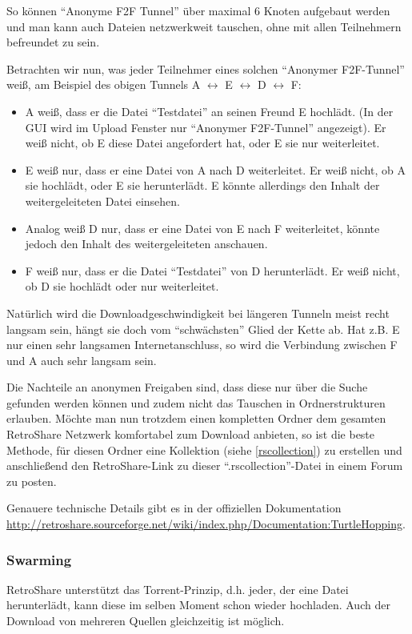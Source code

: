 So können ``Anonyme F2F Tunnel'' über maximal 6 Knoten aufgebaut werden und man kann auch Dateien netzwerkweit tauschen, ohne mit allen Teilnehmern befreundet zu sein.

Betrachten wir nun, was jeder Teilnehmer eines solchen ``Anonymer F2F-Tunnel'' weiß, am Beispiel des obigen Tunnels A $\leftrightarrow$ E $\leftrightarrow$ D  $\leftrightarrow$ F:
\begin{itemize}
 \item A weiß, dass er die Datei ``Testdatei'' an seinen Freund E hochlädt. (In der GUI wird im Upload Fenster nur ``Anonymer F2F-Tunnel'' angezeigt). Er weiß nicht, ob E diese Datei angefordert hat, oder E sie nur weiterleitet.
 \item E weiß nur, dass er eine Datei von A nach D weiterleitet. Er weiß nicht, ob A sie hochlädt, oder E sie herunterlädt. E könnte allerdings den Inhalt der weitergeleiteten Datei einsehen.
 \item Analog weiß D nur, dass er eine Datei von E nach F weiterleitet, könnte jedoch den Inhalt des weitergeleiteten anschauen.
 \item F weiß nur, dass er die Datei ``Testdatei'' von D herunterlädt. Er weiß nicht, ob D sie hochlädt oder nur weiterleitet.
\end{itemize}

Natürlich wird die Downloadgeschwindigkeit bei längeren Tunneln meist recht langsam sein, hängt sie doch vom ``schwächsten'' Glied der Kette ab. Hat z.B. E nur einen sehr langsamen Internetanschluss, so wird die Verbindung zwischen F und A auch sehr langsam sein.

Die Nachteile an anonymen Freigaben sind, dass diese nur über die Suche gefunden werden können und zudem nicht das Tauschen in Ordnerstrukturen erlauben. Möchte man nun trotzdem einen kompletten Ordner dem gesamten RetroShare Netzwerk komfortabel zum Download anbieten, so ist die beste Methode, für diesen Ordner eine Kollektion (siehe \ref{rscollection}) zu erstellen und anschließend den RetroShare-Link zu dieser ``.rscollection''-Datei in einem Forum zu posten.
 
Genauere technische Details gibt es in der offiziellen Dokumentation \url{http://retroshare.sourceforge.net/wiki/index.php/Documentation:TurtleHopping}.

\subsubsection{Swarming}
RetroShare unterstützt das Torrent-Prinzip, d.h. jeder, der eine Datei herunterlädt, kann diese im selben Moment schon wieder hochladen. Auch der Download von mehreren Quellen gleichzeitig ist möglich.

